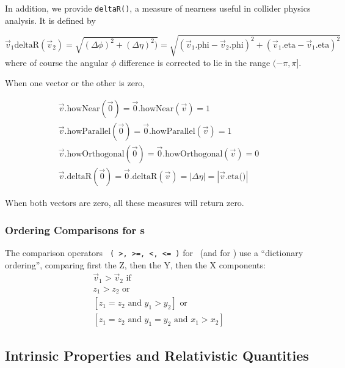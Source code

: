 In addition, we provide \verb$deltaR()$,
a measure of nearness useful in collider physics analysis.
It is defined by

\begin{equation}
\vec{v}_{1} \mbox{deltaR} (\vec{v}_{2}) =
  \sqrt{ (\Delta \phi)^2 + (\Delta \eta)^2) } =
  \sqrt{ \left( \vec{v}_{1}\mbox{.phi} - \vec{v}_{2}\mbox{.phi} \right)^2 +
  \left( \vec{v}_{1}\mbox{.eta} - \vec{v}_{1}\mbox{.eta}  \right)^2 }
  \label{eq:deltaR}
\end{equation}
\noindent
where of course the angular $\phi$ difference is corrected to lie in the range
$(-\pi, \pi]$.

When one vector or the other is zero,

\begin{eqnarray}
\vec{v} \mbox{.howNear} (\vec{0}) =
  \vec{0} \mbox{.howNear} (\vec{v}) = 1
  \label{eq:howNear:3}
  \\
\vec{v} \mbox{.howParallel} (\vec{0}) =
  \vec{0} \mbox{.howParallel} (\vec{v}) = 1
  \label{eq:howPar:2}
  \\
\vec{v} \mbox{.howOrthogonal} (\vec{0}) =
  \vec{0} \mbox{.howOrthogonal} (\vec{v}) = 0
  \label{eq:howOrtho:2}
  \\
\vec{v} \mbox{.deltaR} (\vec{0}) = \vec{0} \mbox{.deltaR} (\vec{v}) =
  \left| \Delta \eta \right| =
  \left| \vec{v}\mbox{.eta()} \right|
  \label{eq:deltaR:2}
\end{eqnarray}

When both vectors are zero, all these measures will return zero.

\subsubsection{Ordering Comparisons for \protect\SV s}

The comparison operators \verb$ ( >, >=, <, <= )$ for \SV\ (and for
\UV) use a ``dictionary ordering'',
comparing first the Z, then the Y, then the
X components:
\begin{eqnarray}
  \vec{v}_1 > \vec{v}_2 \mbox{ if }	\nonumber \\
	z_1 > z_2 \mbox { or } \nonumber \\
	\left[
	z_1 = z_2 \mbox { and }
	y_1 > y_2 \right] \mbox { or } \nonumber \\
	\left[
	z_1 = z_2 \mbox { and }
	y_1 = y_2 \mbox { and }
	x_1 > x_2 \right]
  \label{eq:compSV}
\end{eqnarray}


\subsection{Intrinsic Properties and Relativistic Quantities}

